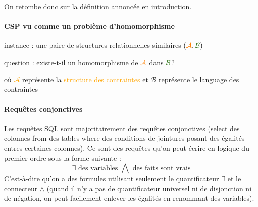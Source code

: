 \documentclass[a4paper,12pt]{article}
\theoremstyle{definition}
\theoremstyle{remark}
\begin{document}
On retombe donc sur la définition annoncée en introduction.

\begin{framed}
  \paragraph{CSP vu comme un problème d'homomorphisme}
  \begin{compactitem}
  \item instance : une paire de structures relationnelles similaires
    $(\textcolor{orange}{\mathcal{A}},\textcolor{OliveGreen}{\mathcal{B}})$
  \item question : existe-t-il un homomorphisme de
    $\textcolor{orange}{\mathcal{A}}$ dans
    $\textcolor{OliveGreen}{\mathcal{B}}$?
  \end{compactitem}
  où \textcolor{orange}{$\mathcal{A}$} représente la
  \textcolor{orange}{structure des contraintes} et \hfill
  \textcolor{OliveGreen}{$\mathcal{B}$} représente le
  \textcolor{OliveGreen}{language des contraintes}
\end{framed}


\paragraph{Requêtes conjonctives}
Les requêtes SQL sont majoritairement des requêtes conjonctives
(select des colonnes  from des tables where des conditions de
jointures posant des égalités entres certaines colonnes). Ce sont des
requêtes qu'on peut écrire en logique du premier ordre sous la forme
suivante :
$$\exists \text{ des variables } \bigwedge \text{ des faits sont vrais
} $$ 
C'est-à-dire qu'on a des formules utilisant seulement le
quantificateur $\exists$ et le connecteur $\land$ (quand il n'y a pas de
quantificateur universel ni de disjonction ni de négation, on peut
facilement enlever les égalités en renommant des variables). 
\end{document}
